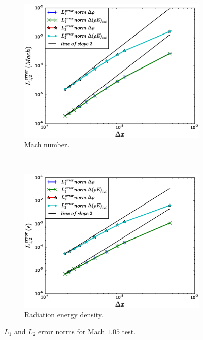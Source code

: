 \documentclass[times,doublespace]{fldauth}%
\begin{document}
\begin{figure}[h]
    \begin{subfigure}{0.5\textwidth}
    \centering
    \includegraphics[width=\linewidth]{figures/cst-xs/mach-1p05/mass-energy-diff-mach-number-convergence.eps}
    \caption{Mach number.}\label{fig:mach-1p05-cst-xs-mach-conv}
    \end{subfigure}
    ~
    \begin{subfigure}{0.5\textwidth}
    \centering
    \includegraphics[width=\linewidth]{figures/cst-xs/mach-1p05/mass-energy-diff-radiation-convergence.eps}
    \caption{Radiation energy density.}\label{fig:mach-1p05-cst-xs-radiation-conv}
    \end{subfigure}        
\caption{$L_1$ and $L_2$ error norms for Mach $1.05$ test.}\label{fig:mach-1p05-cst-xs-conv}    
\end{figure}
%
\end{document}
